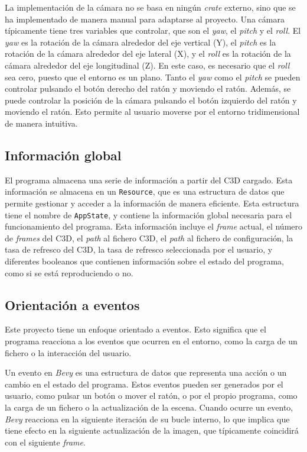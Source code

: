 La implementación de la cámara no se basa en ningún \textit{crate} externo, sino que se ha implementado de manera manual para adaptarse al proyecto. Una cámara típicamente tiene tres variables que controlar, que son el \textit{yaw}, el \textit{pitch} y el \textit{roll}. El \textit{yaw} es la rotación de la cámara alrededor del eje vertical (Y), el \textit{pitch} es la rotación de la cámara alrededor del eje lateral (X), y el \textit{roll} es la rotación de la cámara alrededor del eje longitudinal (Z). En este caso, es necesario que el \textit{roll} sea cero, puesto que el entorno es un plano. Tanto el \textit{yaw} como el \textit{pitch} se pueden controlar pulsando el botón derecho del ratón y moviendo el ratón. Además, se puede controlar la posición de la cámara pulsando el botón izquierdo del ratón y moviendo el ratón. Esto permite al usuario moverse por el entorno tridimensional de manera intuitiva.


\subsection{Información global} \label{sec:bevy-global}

El programa almacena una serie de información a partir del \ac{C3D} cargado. Esta información se almacena en un \texttt{Resource}, que es una estructura de datos que permite gestionar y acceder a la información de manera eficiente. Esta estructura tiene el nombre de \texttt{AppState}, y contiene la información global necesaria para el funcionamiento del programa. Esta información incluye el \textit{frame} actual, el número de \textit{frames} del \ac{C3D}, el \textit{path} al fichero \ac{C3D}, el \textit{path} al fichero de configuración, la tasa de refresco del \ac{C3D}, la tasa de refresco seleccionada por el usuario, y diferentes booleanos que contienen información sobre el estado del programa, como si se está reproduciendo o no.


\subsection{Orientación a eventos} \label{sec:bevy-eventos}

Este proyecto tiene un enfoque orientado a eventos. Esto significa que el programa reacciona a los eventos que ocurren en el entorno, como la carga de un fichero o la interacción del usuario. 

Un evento en \textit{Bevy} es una estructura de datos que representa una acción o un cambio en el estado del programa. Estos eventos pueden ser generados por el usuario, como pulsar un botón o mover el ratón, o por el propio programa, como la carga de un fichero o la actualización de la escena. Cuando ocurre un evento, \textit{Bevy} reacciona en la siguiente iteración de su bucle interno, lo que implica que tiene efecto en la siguiente actualización de la imagen, que típicamente coincidirá con el siguiente \textit{frame}.

